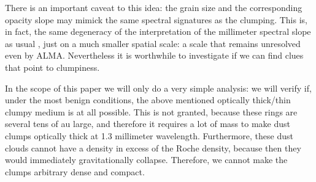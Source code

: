 \documentclass{aa}
\begin{document}
There is an important caveat to this idea: the grain size and the corresponding
opacity slope may mimick the same spectral signatures as the clumping. This is,
in fact, the same degeneracy of the interpretation of the millimeter spectral
slope as usual \citep[e.g.][]{2003A&A...403..323T}, just on a much smaller
spatial scale: a scale that remains unresolved even by ALMA.  Nevertheless it is
worthwhile to investigate if we can find clues that point to clumpiness.

In the scope of this paper we will only do a very simple analysis: we will
verify if, under the most benign conditions, the above mentioned optically
thick/thin clumpy medium is at all possible. This is not granted, because
these rings are several tens of au large, and therefore it requires a lot of
mass to make dust clumps optically thick at 1.3 millimeter wavelength.
Furthermore, these dust clouds cannot have a density in excess of the
Roche density, because then they would immediately gravitationally collapse.
Therefore, we cannot make the clumps arbitrary dense and compact.
\end{document}
